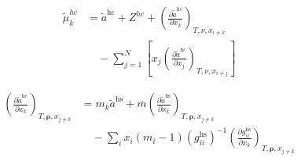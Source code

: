 \documentclass[12pt, letterpaper]{article}
\begin{document}
\begin{equation}
    \begin{aligned}
        \tilde{\mu}^{hc}_{k}
        &=\tilde{a}^{\mathrm{hc}} + Z^{hc}
        +\left(\frac{\partial\tilde{a}^{\mathrm{hc}}}{\partial x_{k}}\right)_{T,\nu,x_{i\neq k}}
        \\
        &\quad -\sum_{j=1}^{N}\left[x_{j}\left(\frac{\partial\tilde{a}^{\mathrm{hc}}}{\partial x_{j}}\right)_{T,\nu,x_{i\neq j}}\right]
    \end{aligned}
    \label{eq:mu_hc}
\end{equation}


\begin{equation}
    \begin{aligned}
        \left(\frac{\partial\tilde{a}^{\mathrm{hc}}}{\partial x_{k}}\right)_{T,\boldsymbol{\rho},x_{j\neq k}}
        &=m_{k}\tilde{a}^{\mathrm{hs}}
        +\bar{m}\left(\frac{\partial\tilde{a}^{\mathrm{hs}}}{\partial x_{k}}\right)_{T,\boldsymbol{\rho},x_{j\neq k}}
        \\
        &\quad -\sum_{i}x_{i}(m_{i}-1)(g_{ii}^{\mathrm{hs}})^{-1}
        \left(\frac{\partial g_{ii}^{\mathrm{hs}}}{\partial x_{k}}\right)_{T,\boldsymbol{\rho},x_{j\neq k}}
    \end{aligned}
    \label{eq:dares_hc_dxk}
\end{equation}

\end{document}
